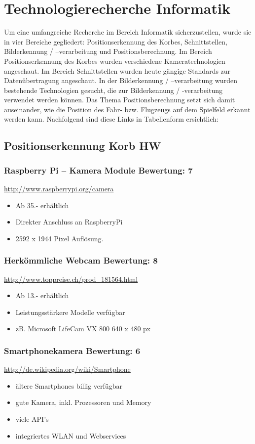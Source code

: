 \section{Technologierecherche Informatik}
Um eine umfangreiche Recherche im Bereich Informatik sicherzustellen, wurde 
sie in vier Bereiche gegliedert: Positionserkennung des Korbes, 
Schnittstellen, Bilderkennung / –verarbeitung und Positionsberechnung. Im 
Bereich Positionserkennung des Korbes wurden verschiedene Kameratechnologien 
angeschaut. Im Bereich Schnittstellen wurden heute gängige Standards zur 
Datenübertragung angeschaut. In der Bilderkennung / –verarbeitung wurden 
bestehende Technologien gesucht, die zur Bilderkennung / -verarbeitung 
verwendet werden können. Das Thema Positionsberechnung setzt sich damit 
auseinander, wie die Position des Fahr- bzw. Flugzeugs auf dem Spielfeld 
erkannt werden kann. Nachfolgend sind diese Links in Tabellenform ersichtlich:

\subsection{Positionserkennung Korb HW}

\subsubsection{Raspberry Pi – Kamera Module \hfill Bewertung: 7}
\url{http://www.raspberrypi.org/camera} \\
\begin{itemize}
    \item Ab 35.- erhältlich
    \item Direkter Anschluss an RaspberryPi
    \item 2592 x 1944 Pixel Auflösung.
\end{itemize}

\subsubsection{Herkömmliche Webcam \hfill Bewertung: 8}
\url{http://www.toppreise.ch/prod_181564.html}
\begin{itemize}
    \item Ab 13.- erhältlich
    \item Leistungsstärkere Modelle verfügbar
    \item zB. Microsoft LifeCam VX 800 640 x 480 px
\end{itemize}

\subsubsection{Smartphonekamera  \hfill Bewertung: 6}
\url{http://de.wikipedia.org/wiki/Smartphone}
\begin{itemize}
    \item ältere Smartphones billig verfügbar
    \item gute Kamera, inkl. Prozessoren und Memory
    \item viele API’s
    \item integriertes WLAN und Webservices
\end{itemize}

